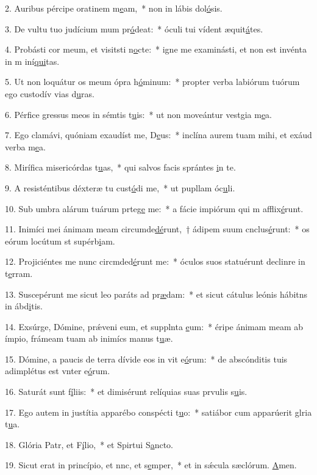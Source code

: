 2. Auribus pércipe oratinem m\uline{e}am,~* non in lábis dol\uline{ó}sis.\par 
3. De vultu tuo judícium mum pr\uline{ó}deat:~* óculi tui vídent æquit\uline{á}tes.\par 
4. Probásti cor meum, et visitsti n\uline{o}cte:~* igne me examinásti, et non est invénta in m iní\uline{qui}tas.\par 
5. Ut non loquátur os meum ópra h\uline{ó}minum:~* propter verba labiórum tuórum ego custodív vias d\uline{u}ras.\par 
6. Pérfice gressus meos in sémtis t\uline{u}is:~* ut non moveántur vestgia m\uline{e}a.\par 
7. Ego clamávi, quóniam exaudíst me, D\uline{e}us:~* inclína aurem tuam mihi, et exáud verba m\uline{e}a.\par 
8. Mirífica misericórdas t\uline{u}as,~* qui salvos facis sprántes \uline{i}n te.\par 
9. A resisténtibus déxteræ tu cust\uline{ó}di me,~* ut pupllam óc\uline{u}li.\par 
10. Sub umbra alárum tuárum prteg\uline{e} me:~* a fácie impiórum qui m afflix\uline{é}runt.\par 
11. Inimíci mei ánimam meam circumde\uline{dé}runt,~† ádipem suum cnclus\uline{é}runt:~* os eórum locútum st supérb\uline{i}am.\par 
12. Projiciéntes me nunc circmded\uline{é}runt me:~* óculos suos statuérunt declinre in t\uline{e}rram.\par 
13. Suscepérunt me sicut leo paráts ad pr\uline{æ}dam:~* et sicut cátulus leónis hábitns in ábd\uline{i}tis.\par 
14. Exsúrge, Dómine, prǽveni eum, et supplnta \uline{e}um:~* éripe ánimam meam ab ímpio, frámeam tuam ab inimícs manus t\uline{u}æ.\par 
15. Dómine, a paucis de terra dívide eos in vit e\uline{ó}rum:~* de abscónditis tuis adimplétus est vnter e\uline{ó}rum.\par 
16. Saturát sunt f\uline{í}liis:~* et dimisérunt relíquias suas prvulis s\uline{u}is.\par 
17. Ego autem in justítia apparébo conspécti t\uline{u}o:~* satiábor cum apparúerit glria t\uline{u}a.\par 
18. Glória Patr, et F\uline{í}lio,~* et Spirtui S\uline{a}ncto.\par 
19. Sicut erat in princípio, et nnc, et s\uline{e}mper,~* et in sǽcula sæclórum. \uline{A}men.\par 
